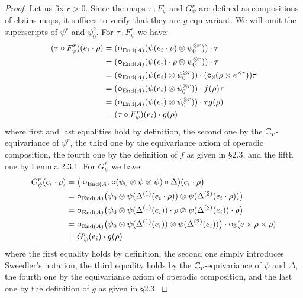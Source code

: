 \documentclass{amsart}
\begin{document}
\begin{enumerate}
	\begin{proof}
		Let us fix $r>0$.
		Since the maps $\tau \comp F^r_\psi$ and $G^r_\psi$ are defined as compositions of chains maps, it suffices to verify that they are $g$-equivariant.
		We will omit the superscripts of $\psi^r$ and $\psi_0^2$.
		For $\tau \comp F^r_\psi$ we have:
		\begin{align*}
			(\tau \mathbin{\circ} F^r_\psi)(e_i \cdot \rho) &=
			(\bm{\mathbin{\circ}}_{\mathrm{End}(A)}(\psi(e_i \cdot \rho) \otimes \psi_0^{\otimes r})) \cdot \tau \\ &=
			(\bm{\mathbin{\circ}}_{\mathrm{End}(A)}(\psi(e_i) \cdot \rho \otimes \psi_0^{\otimes r})) \cdot \tau \\ &=
			(\bm{\mathbin{\circ}}_{\mathrm{End}(A)}(\psi(e_i) \otimes \psi_0^{\otimes r})) \cdot (\bm{\mathbin{\circ}}_{\mathbb{S}} (\rho \times e^{\times r}))\tau \\ &=
			(\bm{\mathbin{\circ}}_{\mathrm{End}(A)}(\psi(e_i) \otimes \psi_0^{\otimes r})) \cdot f(\rho)\tau \\ &=
			(\bm{\mathbin{\circ}}_{\mathrm{End}(A)}(\psi(e_i) \otimes \psi_0^{\otimes r})) \cdot \tau g(\rho) \\ &=
			(\tau \mathbin{\circ} F^r_\psi)(e_i) \cdot g(\rho)
		\end{align*}
		where first and last equalities hold by definition, the second one by the $\mathbb{C}_r$-equivariance of $\psi^r$, the third one by the equivariance axiom of operadic composition, the fourth one by the definition of $f$ as given in \S2.3, and the fifth one by Lemma 2.3.1.
		For $G^r_\psi$ we have:
		\begin{align*}
			G^r_\psi(e_i \cdot \rho) &=
			\big(\bm{\mathbin{\circ}}_{\mathrm{End}(A)} \mathbin{\circ} (\psi_0 \otimes \psi \otimes \psi) \mathbin{\circ} \Delta)(e_i \cdot \rho \big) \\ &=
			\bm{\mathbin{\circ}}_{\mathrm{End}(A)} \big(\psi_0 \otimes \psi(\Delta^{(1)}(e_i \cdot \rho)) \otimes \psi(\Delta^{(2)}(e_i \cdot \rho)) \big) \\ &=
			\bm{\mathbin{\circ}}_{\mathrm{End}(A)} \big(\psi_0 \otimes \psi(\Delta^{(1)}(e_i)) \cdot \rho \otimes \psi(\Delta^{(2)}(e_i)) \cdot \rho \big) \\ &=
			\bm{\mathbin{\circ}}_{\mathrm{End}(A)} \big(\psi_0 \otimes \psi(\Delta^{(1)}(e_i)) \otimes \psi(\Delta^{(2)}(e_i)) \big) \cdot \bm{\mathbin{\circ}}_{\mathbb{S}}(e \times \rho \times \rho) \\ &=
			G^r_\psi(e_i) \cdot g(\rho)
		\end{align*}
		where the first equality holds by definition, the second one simply introduces Sweedler's notation, the third equality holds by the $\mathbb{C}_r$-equivariance of $\psi$ and $\Delta$, the fourth one by the equivariance axiom of operadic composition, and the last one by the definition of $g$ as given in \S2.3.
	\end{proof}


\end{enumerate}
\end{document}
